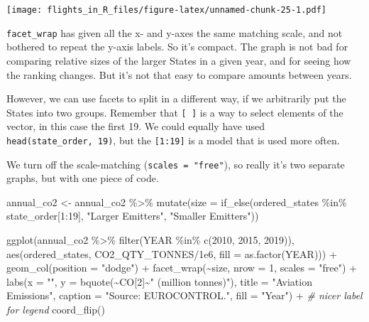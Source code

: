 \documentclass[
]{book}
\newenvironment{Shaded}{\begin{snugshade}}{\end{snugshade}}
\newcommand{\AttributeTok}[1]{\textcolor[rgb]{0.77,0.63,0.00}{#1}}
\newcommand{\CommentTok}[1]{\textcolor[rgb]{0.56,0.35,0.01}{\textit{#1}}}
\newcommand{\DecValTok}[1]{\textcolor[rgb]{0.00,0.00,0.81}{#1}}
\newcommand{\FloatTok}[1]{\textcolor[rgb]{0.00,0.00,0.81}{#1}}
\newcommand{\FunctionTok}[1]{\textcolor[rgb]{0.00,0.00,0.00}{#1}}
\newcommand{\NormalTok}[1]{#1}
\newcommand{\OtherTok}[1]{\textcolor[rgb]{0.56,0.35,0.01}{#1}}
\newcommand{\SpecialCharTok}[1]{\textcolor[rgb]{0.00,0.00,0.00}{#1}}
\newcommand{\StringTok}[1]{\textcolor[rgb]{0.31,0.60,0.02}{#1}}
\begin{document}
\texttt{[image: flights\_in\_R\_files/figure-latex/unnamed-chunk-25-1.pdf]}

\texttt{facet\_wrap} has given all the x- and y-axes the same matching scale, and not bothered to repeat the y-axis labels. So it's compact. The graph is not bad for comparing relative sizes of the larger States in a given year, and for seeing how the ranking changes. But it's not that easy to compare amounts between years.

However, we can use facets to split in a different way, if we arbitrarily put the States into two groups. Remember that \texttt{{[}\ {]}} is a way to select elements of the vector, in this case the first 19. We could equally have used \texttt{head(state\_order,\ 19)}, but the \texttt{{[}1:19{]}} is a model that is used more often.

We turn off the scale-matching (\texttt{scales\ =\ "free"}), so really it's two separate graphs, but with one piece of code.

\begin{Shaded}
\begin{Highlighting}[]
\NormalTok{annual\_co2 }\OtherTok{\textless{}{-}}\NormalTok{ annual\_co2 }\SpecialCharTok{\%\textgreater{}\%} 
  \FunctionTok{mutate}\NormalTok{(}\AttributeTok{size =} \FunctionTok{if\_else}\NormalTok{(ordered\_states }\SpecialCharTok{\%in\%}\NormalTok{ state\_order[}\DecValTok{1}\SpecialCharTok{:}\DecValTok{19}\NormalTok{], }
                        \StringTok{"Larger Emitters"}\NormalTok{, }\StringTok{"Smaller Emitters"}\NormalTok{))}

\FunctionTok{ggplot}\NormalTok{(annual\_co2 }\SpecialCharTok{\%\textgreater{}\%} 
         \FunctionTok{filter}\NormalTok{(YEAR }\SpecialCharTok{\%in\%} \FunctionTok{c}\NormalTok{(}\DecValTok{2010}\NormalTok{, }\DecValTok{2015}\NormalTok{, }\DecValTok{2019}\NormalTok{)), }
       \FunctionTok{aes}\NormalTok{(ordered\_states,}
\NormalTok{           CO2\_QTY\_TONNES}\SpecialCharTok{/}\FloatTok{1e6}\NormalTok{,}
           \AttributeTok{fill =} \FunctionTok{as.factor}\NormalTok{(YEAR))) }\SpecialCharTok{+}  
  \FunctionTok{geom\_col}\NormalTok{(}\AttributeTok{position =} \StringTok{"dodge"}\NormalTok{) }\SpecialCharTok{+}
  \FunctionTok{facet\_wrap}\NormalTok{(}\SpecialCharTok{\textasciitilde{}}\NormalTok{size, }\AttributeTok{nrow =} \DecValTok{1}\NormalTok{, }\AttributeTok{scales =} \StringTok{"free"}\NormalTok{) }\SpecialCharTok{+} 
  \FunctionTok{labs}\NormalTok{(}\AttributeTok{x =} \StringTok{""}\NormalTok{, }
       \AttributeTok{y =} \FunctionTok{bquote}\NormalTok{(}\SpecialCharTok{\textasciitilde{}}\NormalTok{CO[}\DecValTok{2}\NormalTok{]}\SpecialCharTok{\textasciitilde{}}\StringTok{" (million tonnes)"}\NormalTok{),}
       \AttributeTok{title =} \StringTok{"Aviation Emissions"}\NormalTok{,}
       \AttributeTok{caption =} \StringTok{"Source: EUROCONTROL."}\NormalTok{,}
       \AttributeTok{fill =} \StringTok{"Year"}\NormalTok{) }\SpecialCharTok{+} \CommentTok{\# nicer label for legend}
  \FunctionTok{coord\_flip}\NormalTok{()}
\end{Highlighting}
\end{Shaded}
\end{document}
